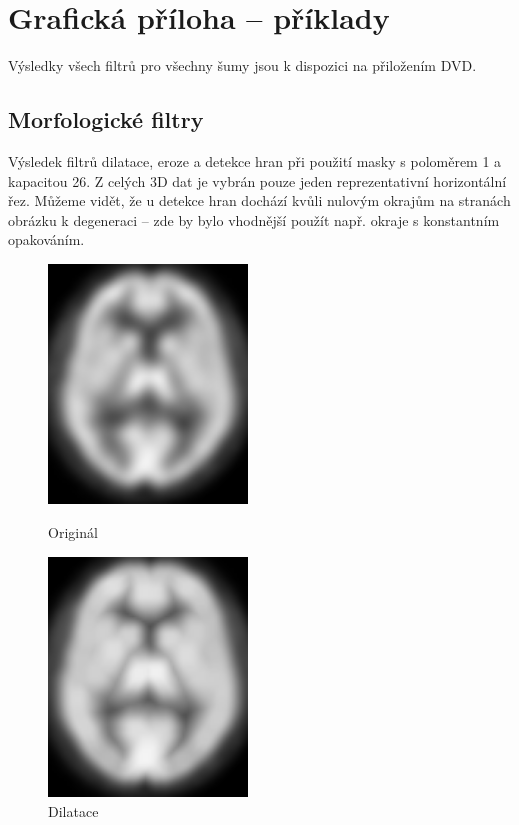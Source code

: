 \chapter{Grafická příloha -- příklady}\label{příloha obrázky}

    Výsledky všech filtrů pro všechny šumy jsou k dispozici na přiložením DVD.

    \section{Morfologické filtry}

    Výsledek filtrů dilatace, eroze a detekce hran při použití masky s poloměrem 1 a kapacitou 26. Z celých 3D dat je vybrán pouze jeden reprezentativní horizontální řez. Můžeme vidět, že u detekce hran dochází kvůli nulovým okrajům na stranách obrázku k degeneraci -- zde by bylo vhodnější použít např. okraje s konstantním opakováním.
    \vfill
    \newpage
    \begin{figure}[htp]
        \begin{minipage}[l]{0.5\textwidth}
            \center
            \includegraphics[width = 150pt]{src/8Appendix/final/original.png}
            \caption{Originál}
        \end{minipage}
        \begin{minipage}[r]{0.5\textwidth}
            \center
            \includegraphics[width = 150pt]{src/8Appendix/final/dilatace.png}
            \caption{Dilatace}
        \end{minipage}
     \end{figure}
